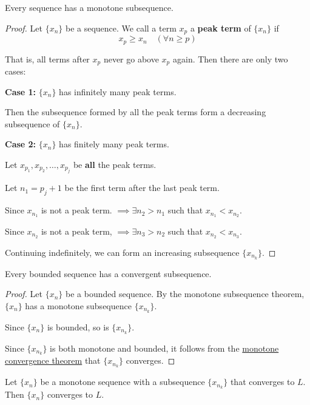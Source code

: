 \label{dddb70e}

Every sequence has a monotone subsequence.

\begin{proof}
  \def\xn{\{x_n\}}

  Let $\xn$ be a sequence. We call a term $x_p$ a \textbf{peak term} of $\xn$ if
  $$x_p\geq x_n\quad(\forall n\geq p)$$

  That is, all terms after $x_p$ never go above $x_p$ again. Then there are only
  two cases:

  \textbf{Case 1:} $\xn$ has infinitely many peak terms.

  Then the subsequence formed by all the peak terms form a decreasing subsequence
  of $\xn$.

  \textbf{Case 2:} $\xn$ has finitely many peak terms.

  Let $x_{p_1},x_{p_2},\ldots,x_{p_j}$ be \textbf{all} the peak terms.

  Let $n_1=p_j+1$ be the first term after the last peak term.

  Since $x_{n_1}$ is not a peak term. $\implies\exists n_2>n_1$ such that
  $x_{n_1}<x_{n_2}$.

  Since $x_{n_2}$ is not a peak term, $\implies\exists n_3>n_2$ such that
  $x_{n_2}<x_{n_3}$.

  Continuing indefinitely, we can form an increasing subsequence $\{x_{n_k}\}$.
\end{proof}

\label{d277ad0}

Every bounded sequence has a convergent subsequence.

\begin{proof}
  \def\xn{\{x_n\}}
  \def\xnk{\{x_{n_k}\}}

  Let $\xn$ be a bounded sequence. By the monotone subsequence theorem, $\xn$ has
  a monotone subsequence $\xnk$.

  Since $\xn$ is bounded, so is $\xnk$.

  Since $\xnk$ is both monotone and bounded, it follows from the
  \href{ca25eb7}{monotone convergence theorem} that $\xnk$ converges.
\end{proof}


\label{aaf3ba6}

Let $\{x_n\}$ be a monotone sequence with a subsequence $\{x_{n_k}\}$ that
converges to $L$. Then $\{x_n\}$ converges to $L$.

